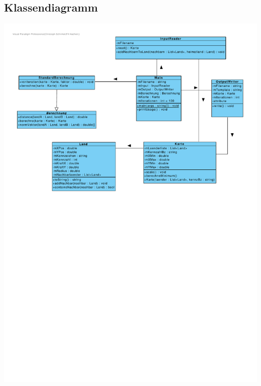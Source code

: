 \documentclass[a4paper,11pt]{article}
\begin{document}
{\subsection{Klassendiagramm}
\begin{center}
\includegraphics[width=\linewidth]{klassendiagramm_gropro.pdf}
\end{center}
}
\end{document}
